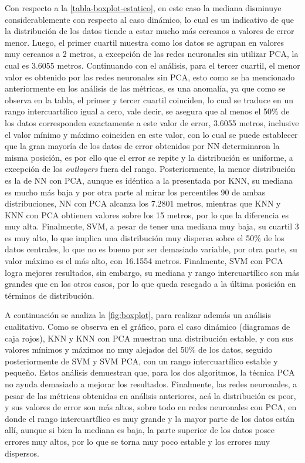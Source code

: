 Con respecto a la \autoref{tabla-boxplot-estatico}, en este caso la mediana disminuye considerablemente con respecto al caso dinámico, lo cual es un indicativo de que la distribución de los datos tiende a estar mucho más cercanos a valores de error menor. Luego, el primer cuartil muestra como los datos se agrupan en valores muy cercanos a 2 metros, a excepción de las redes neuronales sin utilizar PCA, la cual es 3.6055 metros. Continuando con el análisis, para el tercer cuartil, el menor valor es obtenido por las redes neuronales sin PCA, esto como se ha mencionado anteriormente en los análisis de las métricas, es una anomalía, ya que como se observa en la tabla, el primer y tercer cuartil coinciden, lo cual se traduce en un rango intercuartílico igual a cero, vale decir, se asegura que al menos el 50\% de los datos corresponden exactamente a este valor de error, 3.6055 metros, inclusive el valor mínimo y máximo coinciden en este valor, con lo cual se puede establecer que la gran mayoría de los datos de error obtenidos por NN determinaron la misma posición, es por ello que el error se repite y la distribución es uniforme, a excepción de los \textit{outlayers} fuera del rango. Posteriormente, la menor distribución es la de NN con PCA, aunque es idéntica a la presentada por KNN, su mediana es mucho más baja y por otra parte al mirar los percentiles 90 de ambas distribuciones, NN con PCA alcanza los 7.2801 metros, mientras que KNN y KNN con PCA obtienen valores sobre los 15 metros, por lo que la diferencia es muy alta. Finalmente, SVM, a pesar de tener una mediana muy baja, su cuartil 3 es muy alto, lo que implica una distribución muy dispersa sobre el 50\% de los datos centrales, lo que no es bueno por ser demasiado variable, por otra parte, su valor máximo es el más alto, con 16.1554 metros. Finalmente, SVM con PCA logra mejores resultados, sin embargo, su mediana y rango intercuartílico son más grandes que en los otros casos, por lo que queda resegado a la última posición en términos de distribución.

A continuación se analiza la \autoref{fig:boxplot}, para realizar además un análisis cualitativo. Como se observa en el gráfico, para el caso dinámico (diagramas de caja rojos), KNN y KNN con PCA muestran una distribución estable, y con sus valores mínimos y máximos no muy alejados del 50\% de los datos, seguido posteriormente de SVM y SVM PCA, con un rango intercuartílico estable y pequeño. Estos análisis demuestran que, para los dos algoritmos, la técnica PCA no ayuda demasiado a mejorar los resultados. Finalmente, las redes neuronales, a pesar de las métricas obtenidas en análisis anteriores, acá la distribución es peor, y sus valores de error son más altos, sobre todo en redes neuronales con PCA, en donde el rango intercuartílico es muy grande y la mayor parte de los datos están allí, aunque si bien la mediana es baja, la parte superior de los datos posee errores muy altos, por lo que se torna muy poco estable y los errores muy dispersos.

